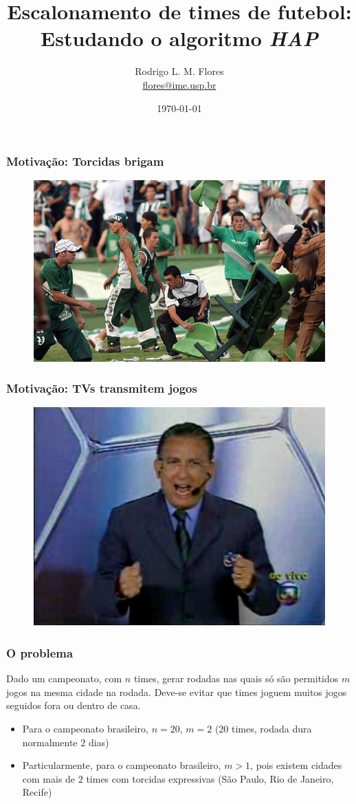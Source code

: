 \documentclass{beamer}
\title{Escalonamento de times de futebol: Estudando o algoritmo \textit{HAP}}
\author{Rodrigo L. M. Flores \\ \url{flores@ime.usp.br}}
\institute{Instituto de Matemática e Estatística\\Universidade de São Paulo}
\begin{document}
\date{\today}

\frame{\titlepage}

\begin{frame}
  \frametitle{Motivação: Torcidas brigam}
  \begin{figure}
    \includegraphics[scale=0.3]{torcida.jpg}
  \end{figure}
\end{frame}


\begin{frame}
  \frametitle{Motivação: TVs transmitem jogos}
  \begin{figure}
    \includegraphics[scale=0.5]{galvao.jpg}
  \end{figure}
\end{frame}

\begin{frame}
  \frametitle{O problema}
  Dado um campeonato, com $n$ times, gerar rodadas nas quais só são permitidos $m$ jogos 
  na mesma cidade na rodada. Deve-se evitar que times joguem muitos jogos
  seguidos fora ou dentro de casa.

  \begin{itemize}
    \item Para o campeonato brasileiro, $n = 20$, $m = 2$ ($20$ times, rodada dura normalmente $2$ dias)
    \item Particularmente, para o campeonato brasileiro, $m > 1$, pois existem cidades com mais de $2$ times com torcidas expressivas 
  (São Paulo, Rio de Janeiro, Recife)
  \end{itemize}
\end{frame}
\end{document}
